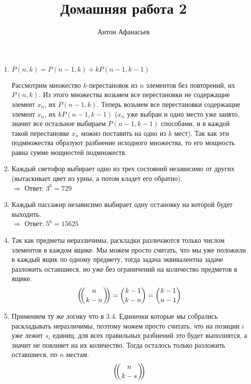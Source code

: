 \documentclass[10pt]{article}
\newcommand{\rchoose}[2]{\left(\mkern-6mu \left({#1 \atop #2}\right) \mkern-6mu \right)}
\begin{document}
\title{Домашняя работа 2}
\author{Антон Афанасьев}
\maketitle

\begin{enumerate}[label*=3.\arabic*]
	\item $P(n, k) = P(n-1, k) + kP(n-1, k-1)$
	
	Рассмотрим множество $k$-перестановок из $n$ элементов без повторений, их $P(n, k)$. Из этого множества возьмем все перестановки не содержащие элемент $x_n$, их $P(n-1, k)$. Теперь возьмем все перестановки содержащие элемент $x_n$, их $kP(n-1, k-1)$ ($x_n$ уже выбран и одно место уже занято, значит все остальное выбираем $P(n-1, k-1)$ способами, и в каждой такой перестановке $x_n$ можно поставить на одно из $k$ мест). Так как эти подмножества образуют разбиение исходного множества, то его мощность равна сумме мощностей подмножеств.
	
	\item Каждый светофор выбирает одно из трех состояний независимо от других (вытаскивает цвет из урны, а потом кладет его обратно).\\
	$\Rightarrow$ Ответ: $3^6=729$
	
	\item Каждый пассажир независимо выбирает одну остановку на которой будет выходить.\\
	$\Rightarrow$ Ответ: $5^6=15625$
	
	\item Так как предметы неразличимы, раскладки различаются только числом элементов в каждом ящике. Мы можем просто считать, что мы уже положили в каждый ящик по одному предмету, тогда задача эквивалентна задаче разложить оставшиеся, но уже без ограничений на количество предметов в ящике.
	$$\rchoose{n}{k-n} = \binom{k-1}{k-n} = \binom{k-1}{n-1}$$

	\item Применяем ту же логику что в 3.4. Единички которые мы собрались раскладывать неразличимы, поэтому можем просто считать, что на позиции $i$ уже лежит $s_i$ единиц, для всех правильных разбиений это будет выполнятся, а значит не повлияет на их количество. Тогда осталось только разложить оставшиеся, по $n$ местам.
	$$\rchoose{n}{k-s}$$
	
\end{enumerate}
\end{document}
